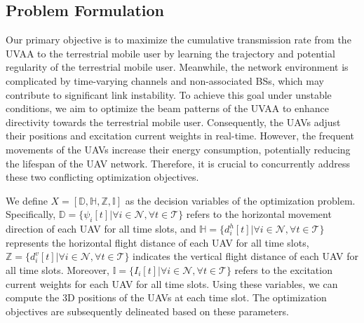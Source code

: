 \documentclass[10pt,journal,compsoc]{IEEEtran}
\begin{document}
\subsection{Problem Formulation}

\par Our primary objective is to maximize the cumulative transmission rate from the UVAA to the terrestrial mobile user by learning the trajectory and potential regularity of the terrestrial mobile user. Meanwhile, the network environment is complicated by time-varying channels and non-associated BSs, which may contribute to significant link instability. To achieve this goal under unstable conditions, we aim to optimize the beam patterns of the UVAA to enhance directivity towards the terrestrial mobile user. Consequently, the UAVs adjust their positions and excitation current weights in real-time. However, the frequent movements of the UAVs increase their energy consumption, potentially reducing the lifespan of the UAV network. Therefore, it is crucial to concurrently address these two conflicting optimization objectives.

\par We define $X = \left[ \mathbb{D}, \mathbb{H}, \mathbb{Z}, \mathbb{I} \right]$ as the decision variables of the optimization problem. Specifically, $\mathbb{D} = \{ \psi_i[t] | \forall i \in \mathcal{N}, \forall t \in \mathcal{T} \}$ refers to the horizontal movement direction of each UAV for all time slots, and $\mathbb{H} = \{ d^h_i[t] | \forall i \in \mathcal{N}, \forall t \in \mathcal{T} \}$ represents the horizontal flight distance of each UAV for all time slots, $\mathbb{Z} = \{ d^v_i[t] | \forall i \in \mathcal{N}, \forall t \in \mathcal{T} \}$ indicates the vertical flight distance of each UAV for all time slots. Moreover, $\mathbb{I} = \{ I_i[t] | \forall i \in \mathcal{N}, \forall t \in \mathcal{T} \}$ refers to the excitation current weights for each UAV for all time slots. Using these variables, we can compute the 3D positions of the UAVs at each time slot. The optimization objectives are subsequently delineated based on these parameters. 

\end{document}

